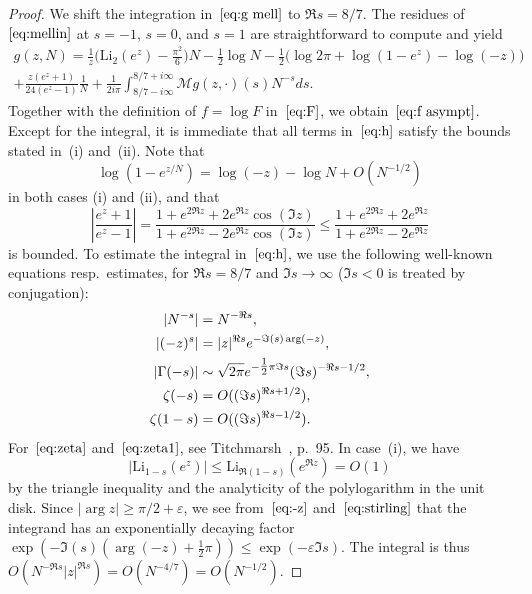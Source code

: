 \documentclass[a4paper]{amsart}
\begin{document}
\begin{proof}
    We shift the integration in~$\eqref{eq:g mell}$ to $\Re s=8/7$.
   The residues of~$\eqref{eq:mellin}$ at $s=-1$, $s=0$, and $s=1$ are straightforward
   to compute and yield
  \begin{multline*}
         g(z,N) = \frac{1}{z}\Big( \mathrm{Li}_2(e^z) - \frac{\pi^2}{6}\Big)N
   - \frac12 \log N 
    - \frac12 \Big(\log 2\pi    +\log(1-e^{z})  - \log(-z)\Big)\\
         + \frac{z(e^z+1)}{24(e^z-1)} \frac1N
         +\frac{1}{2i\pi}\int_{8/7-i\infty}^{8/7+i\infty}  \mathcal{M}g(z,\cdot)(s) N^{-s} ds.
  \end{multline*}
   Together with the definition of $f=\log F$ in~$\eqref{eq:F}$, we obtain~$\eqref{eq:f asympt}$.
   Except for the integral, it is immediate that all terms in~$\eqref{eq:h}$ satisfy
   the bounds stated in~(i) and~(ii). Note  that
   \[
     \log(1-e^{z/N}) = \log(-z) - \log N + O(N^{-1/2})
   \]
   in both cases (i) and (ii), and that
   \[
    \left |\frac{e^z+1}{e^z-1}\right| 
      = \frac{1+e^{2 \Re z} +2e^{ \Re z} \cos(\Im z)}
        {1+e^{2 \Re z} -2e^{ \Re z} \cos(\Im z)}
      \leq \frac{1+e^{2 \Re z} +2e^{ \Re z} }
        {1+e^{2 \Re z} -2e^{ \Re z} }
  \]
  is bounded. To estimate the integral in~$\eqref{eq:h}$, we use
  the following well-known equations resp.\ estimates, for $\Re s= 8/7$ and
  $\Im s\to \infty$ ($\Im s<0$ is treated by conjugation):
  \begin{align}
    |N^{-s}| &= N^{-\Re s}, \notag \\
    |(-z)^s| &= |z|^{\Re s} e^{-\Im(s) \arg(-z)}, \label{eq:-z} \\
    |\Gamma(-s)| &\sim \sqrt{2\pi} e^{-\tfrac12\pi \Im s} (\Im s)^{-\Re s - 1/2},  \label{eq:stirling}  \\
    \zeta(-s) &= O((\Im s)^{\Re s+1/2}),  \label{eq:zeta} \\
    \zeta(1-s)&= O((\Im s)^{ \Re s-1/2}).   \label{eq:zeta1}
  \end{align}
  For~$\eqref{eq:zeta}$ and~$\eqref{eq:zeta1}$, see Titchmarsh~\cite{Ti86}, p.~95.
  In case~(i), we have
  \[
    |\mathrm{Li}_{1-s}(e^z) | \leq \mathrm{Li}_{\Re(1-s)}(e^{\Re z}) = O(1)
  \]
  by the triangle inequality and the analyticity of the polylogarithm
  in the unit disk.
  Since $|\arg z|\geq \pi/2+\varepsilon$, we see from~$\eqref{eq:-z}$
  and~$\eqref{eq:stirling}$ that the integrand has an exponentially decaying factor
  $\exp(-\Im(s) (\arg(-z) + \tfrac12 \pi )) \leq \exp(-\varepsilon\Im s)$.
  The integral is thus $O(N^{-\Re s}|z|^{\Re s})=O(N^{-4/7})=O(N^{-1/2})$.
  

\end{proof}
\end{document}
